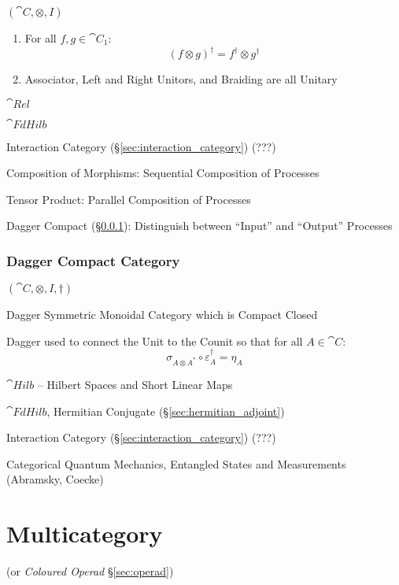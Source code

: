 $(\cat{C}, \otimes, I)$

\begin{enumerate}
  \item For all $f,g \in \cat{C}_1$:
    \[
      (f \otimes g)^\dag = f^\dag \otimes g^\dag
    \]
  \item Associator, Left and Right Unitors, and Braiding are all
    Unitary
\end{enumerate}

$\cat{Rel}$

$\cat{FdHilb}$

Interaction Category (\S\ref{sec:interaction_category}) (???)

Composition of Morphisms: Sequential Composition of Processes

Tensor Product: Parallel Composition of Processes

Dagger Compact (\S\ref{sec:dagger_compact}): Distinguish between
``Input'' and ``Output'' Processes




\subsubsection{Dagger Compact Category}\label{sec:dagger_compact}

$(\cat{C}, \otimes, I, \dag)$

Dagger Symmetric Monoidal Category which is Compact Closed

Dagger used to connect the Unit to the Counit so that for all $A \in
\cat{C}$:
\[
  \sigma_{A \otimes A^*} \circ \varepsilon_A^\dag = \eta_A
\]

$\cat{Hilb}$ -- Hilbert Spaces and Short Linear Maps

$\cat{FdHilb}$, Hermitian Conjugate (\S\ref{sec:hermitian_adjoint})

Interaction Category (\S\ref{sec:interaction_category}) (???)

Categorical Quantum Mechanics, Entangled States and Measurements
(Abramsky, Coecke)



\section{Multicategory}\label{sec:multicategory}

(or \emph{Coloured Operad} \S\ref{sec:operad})

